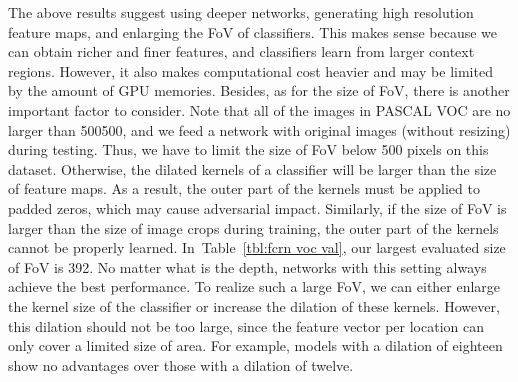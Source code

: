 \documentclass{article}
\begin{document}
The above results suggest
using deeper networks, generating high resolution feature maps, and enlarging the FoV of classifiers.
This  makes sense because we can obtain richer and finer features, and  classifiers learn from larger context regions.
However, it also makes computational cost heavier and may be limited by the amount of GPU memories.
Besides, as for the size of FoV, there is another important factor to consider.
Note that all of the images in PASCAL VOC are no larger than 500500, and we feed a network with original images (without resizing) during testing.
Thus, we have to limit the size of FoV below 500 pixels on this dataset.
Otherwise, the dilated kernels of a classifier will be larger than the size of feature maps.
As a result, the outer part of the kernels must be applied to padded zeros, which may cause adversarial impact.
Similarly, if the size of FoV is larger than the size of image crops during training, the outer part of the kernels cannot be properly learned.
In~Table~\ref{tbl:fcrn voc val}, our largest evaluated size of FoV is 392.
No matter what is the depth, networks with this setting always achieve the best performance.
To realize such a large FoV, we can either enlarge the kernel size of the classifier or increase the dilation of these kernels.
However, this dilation should not be too large, since the feature vector per location can only cover a limited size of area.
For example, models with a dilation of eighteen show no advantages over those with a dilation of twelve.
\end{document}
